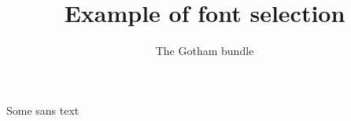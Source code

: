 \documentclass[11pt]{article}
\title{Example of font selection}
\author{The Gotham bundle}
\begin{document}
\maketitle

\textsf{Some sans text}

\blinddocument
\end{document}
